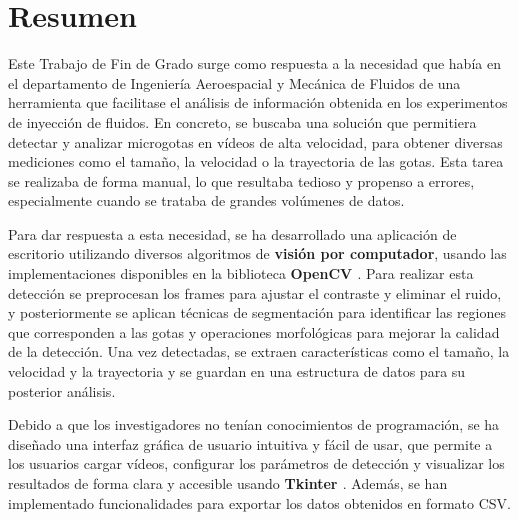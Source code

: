 \chapter*{Resumen}

Este Trabajo de Fin de Grado surge como respuesta a la necesidad que había en el departamento de Ingeniería Aeroespacial y Mecánica de Fluidos de una herramienta que facilitase el análisis de información obtenida en los experimentos de inyección de fluidos. En concreto, se buscaba una solución que permitiera detectar y analizar microgotas en vídeos de alta velocidad, para obtener diversas mediciones como el tamaño, la velocidad o la trayectoria de las gotas. Esta tarea se realizaba de forma manual, lo que resultaba tedioso y propenso a errores, especialmente cuando se trataba de grandes volúmenes de datos.

Para dar respuesta a esta necesidad, se ha desarrollado una aplicación de escritorio utilizando diversos algoritmos de \textbf{visión por computador}, usando las implementaciones disponibles en la biblioteca \textbf{OpenCV \cite{opencv_library}}. Para realizar esta detección se preprocesan los frames para ajustar el contraste y eliminar el ruido, y posteriormente se aplican técnicas de segmentación para identificar las regiones que corresponden a las gotas y operaciones morfológicas para mejorar la calidad de la detección. Una vez detectadas, se extraen características como el tamaño, la velocidad y la trayectoria y se guardan en una estructura de datos para su posterior análisis.

Debido a que los investigadores no tenían conocimientos de programación, se ha diseñado una interfaz gráfica de usuario intuitiva y fácil de usar, que permite a los usuarios cargar vídeos, configurar los parámetros de detección y visualizar los resultados de forma clara y accesible usando \textbf{Tkinter \cite{python_tkinter}}. Además, se han implementado funcionalidades para exportar los datos obtenidos en formato CSV.